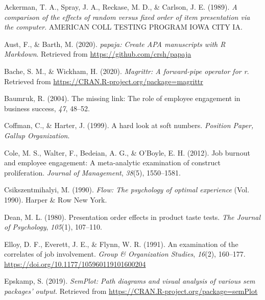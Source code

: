 \documentclass[
  english,
  man]{apa6}
\begin{document}
\begingroup
\setlength{\parindent}{-0.5in}
\setlength{\leftskip}{0.5in}

\hypertarget{refs}{}
\leavevmode\hypertarget{ref-ackerman1989comparison}{}%
Ackerman, T. A., Spray, J. A., Reckase, M. D., \& Carlson, J. E. (1989). \emph{A comparison of the effects of random versus fixed order of item presentation via the computer}. AMERICAN COLL TESTING PROGRAM IOWA CITY IA.

\leavevmode\hypertarget{ref-R-papaja}{}%
Aust, F., \& Barth, M. (2020). \emph{papaja: Create APA manuscripts with R Markdown}. Retrieved from \url{https://github.com/crsh/papaja}

\leavevmode\hypertarget{ref-R-magrittr}{}%
Bache, S. M., \& Wickham, H. (2020). \emph{Magrittr: A forward-pipe operator for r}. Retrieved from \url{https://CRAN.R-project.org/package=magrittr}

\leavevmode\hypertarget{ref-baumruk2004missing}{}%
Baumruk, R. (2004). The missing link: The role of employee engagement in business success, \emph{47}, 48--52.

\leavevmode\hypertarget{ref-coffman_hard_1999}{}%
Coffman, C., \& Harter, J. (1999). A hard look at soft numbers. \emph{Position Paper, Gallup Organization}.

\leavevmode\hypertarget{ref-cole2012job}{}%
Cole, M. S., Walter, F., Bedeian, A. G., \& O'Boyle, E. H. (2012). Job burnout and employee engagement: A meta-analytic examination of construct proliferation. \emph{Journal of Management}, \emph{38}(5), 1550--1581.

\leavevmode\hypertarget{ref-csikszentmihalyi1990flow}{}%
Csikszentmihalyi, M. (1990). \emph{Flow: The psychology of optimal experience} (Vol. 1990). Harper \& Row New York.

\leavevmode\hypertarget{ref-dean1980presentation}{}%
Dean, M. L. (1980). Presentation order effects in product taste tests. \emph{The Journal of Psychology}, \emph{105}(1), 107--110.

\leavevmode\hypertarget{ref-elloy_examination_1991}{}%
Elloy, D. F., Everett, J. E., \& Flynn, W. R. (1991). An examination of the correlates of job involvement. \emph{Group \& Organization Studies}, \emph{16}(2), 160--177. \url{https://doi.org/10.1177/105960119101600204}

\leavevmode\hypertarget{ref-R-semPlot}{}%
Epskamp, S. (2019). \emph{SemPlot: Path diagrams and visual analysis of various sem packages' output}. Retrieved from \url{https://CRAN.R-project.org/package=semPlot}
\end{document}
